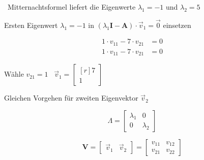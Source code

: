 \textrightarrow\ Mitternachtsformel liefert die Eigenwerte $\lambda_1 = -1$ und $\lambda_2 = 5$

\begin{minipage}[t]{0.56\columnwidth}
    Ersten Eigenwert $\lambda_1 = -1$ in $(\lambda_1 \bm{I} - \bm{A}) \cdot \vec{v}_1 = \vec{0}$ einsetzen
\end{minipage}
\hfill
\begin{minipage}[c]{0.4\columnwidth}
    \begin{align*}
        1 \cdot v_{11} - 7 \cdot v_{21} &= 0 \\
        1 \cdot v_{11} - 7 \cdot v_{21} &= 0 
    \end{align*}
\end{minipage}

\begin{minipage}[c]{0.4\columnwidth}
    Wähle $v_{21} = 1$ \quad \textrightarrow\ $ \vec{v}_1 = \begin{bmatrix*}[r] 7 \\ 1 \end{bmatrix*} $
\end{minipage}
\hfill
\begin{minipage}[c]{0.56\columnwidth}
   Gleichen Vorgehen für zweiten Eigenvektor $\vec{v}_2$
\end{minipage}

\begin{minipage}[c]{0.48\columnwidth}
    $$ \Lambda = \begin{bmatrix} \lambda_1 & 0 \\ 0 & \lambda_2 \end{bmatrix} $$
\end{minipage}
\hfill
\begin{minipage}[c]{0.48\columnwidth}
    $$ \bm{V} = \begin{bmatrix} \vec{v}_1 & \vec{v}_2 \end{bmatrix} = \begin{bmatrix} v_{11} & v_{12} \\ v_{21} & v_{22} \end{bmatrix} $$
\end{minipage}







